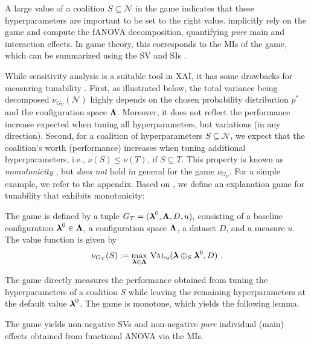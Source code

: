 \documentclass[letterpaper]{article} %
\begin{document}
A large value of a coalition $S \subseteq \mathcal N$ in the \sensitivity game indicates that these hyperparameters are important to be set to the right value.
\citet{fANOVA} implicitly rely on the \sensitivity game and compute the fANOVA decomposition, quantifying \emph{pure} main and interaction effects.
In game theory, this corresponds to the \glspl*{MI} of the \sensitivity game, which can be summarized using the \gls*{SV} and \glspl*{SI} \citep{Fumagalli.2024a}.

While sensitivity analysis is a suitable tool in XAI, it has some drawbacks for measuring tunability \cite{tunability}.
First, as illustrated below, the total variance being decomposed $\nu_{G_V}(\mathcal N)$ highly depends on the chosen probability distribution $p^*$ and the configuration space $\boldsymbol{\Lambda}$.
Moreover, it does not reflect the performance increase expected when tuning all hyperparameters, but variations (in any direction).
Second, for a coalition of hyperparameters $S \subseteq \mathcal N$, we expect that the coalition's worth (performance) increases when tuning additional hyperparameters, i.e., $\nu(S) \leq  \nu(T)$, if $S \subseteq T$.
This property is known as \emph{monotonicity} \citep{Fujimoto.2006}, but \emph{does not} hold in general for the \sensitivity game $\nu_{G_V}$.
For a simple example, we refer to the appendix.
Based on \citet{tunability}, we define an explanation game for tunability that exhibits monotonicity:

\begin{definition}\label{def:tunability}
The \dstunability game is defined by a tuple $G_T = (\boldsymbol{\lambda}^0, \boldsymbol{\Lambda}, D, u),$
consisting of a baseline configuration $\boldsymbol{\lambda}^0 \in \boldsymbol{\Lambda}$, a configuration space $\boldsymbol{\Lambda}$, a dataset $D$, and a measure $u$. The value function is given by
\[
\nu_{G_T}(S) := \max_{\boldsymbol{\lambda} \in \boldsymbol{\Lambda}}
\,\textsc{Val}_u(\boldsymbol{\lambda} \oplus_S \boldsymbol{\lambda}^0, D) \,\, .
\]
\end{definition}

The \dstunability game directly measures the performance obtained from tuning the hyperparameters of a coalition $S$ while leaving the remaining hyperparameters at the default value $\boldsymbol{\lambda}^0$.
The \dstunability game is monotone, which yields the following lemma.

\begin{proposition}
    The \dstunability game yields non-negative \glspl*{SV} and non-negative \emph{pure} individual (main) effects obtained from functional ANOVA via the \glspl*{MI}.
\end{proposition}
\end{document}
